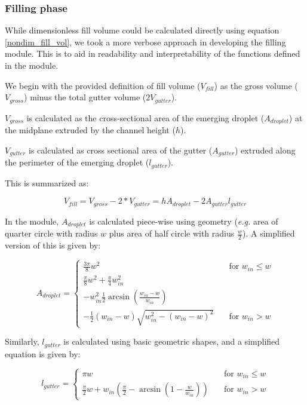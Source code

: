 \subsubsection{Filling phase}

While dimensionless fill volume could be calculated directly using equation \eqref{nondim_fill_vol},
we took a more verbose approach in developing the filling module. This is to aid in readability and
interpretability of the functions defined in the module.

We begin with the provided definition of fill volume ($V_{fill}$) as the gross volume
($V_{gross}$) minus the total gutter volume ($2V_{gutter}$).

$V_{gross}$ is calculated as the cross-sectional area of the emerging droplet ($A_{droplet}$)
at the midplane extruded by the channel height ($h$).

$V_{gutter}$ is calculated as cross sectional area of the gutter ($A_{gutter}$) extruded along
the perimeter of the emerging droplet ($l_{gutter}$).

This is summarized as:

\begin{equation}
  V_{fill} = V_{gross} - 2*V_{gutter} = hA_{droplet} - 2A_{gutter}l_{gutter} \label{fill_vol}
\end{equation}

\noindent In the module, $A_{droplet}$ is calculated piece-wise using geometry (\emph{e.g.} area of quarter circle with 
radius $w$ plus area of half circle with radius $\frac{w}{2}$). A simplified version of this is given by:

$$
A_{droplet} = 
    \begin{cases}
      \frac{3\pi}{8}w^2 & \quad \text{for } w_{in} \leq w\\
      \frac{\pi}{8}w^2 + \frac{\pi}{4}w_{in}^2 \\
      - w_{in}^2\frac{1}{2}\arcsin{\left(\frac{w_{in}-w}{w_{in}}\right)} \\
      - \frac{1}{2}\left(w_{in}-w\right)\sqrt{w_{in}^2 - \left(w_{in}-w\right)^2} & \quad \text{for } w_{in} > w
    \end{cases}
$$

\noindent Similarly, $l_{gutter}$ is calculated using basic geometric shapes, and a simplified
equation is given by:

$$
l_{gutter} = 
    \begin{cases}
      {\pi}w & \quad \text{for } w_{in} \leq w\\
      \frac{\pi}{2}w+w_{in}\left(\frac{\pi}{2}-\arcsin\left(1-\frac{w}{w_{in}}\right)\right) & \quad \text{for } w_{in} > w
    \end{cases}
$$


